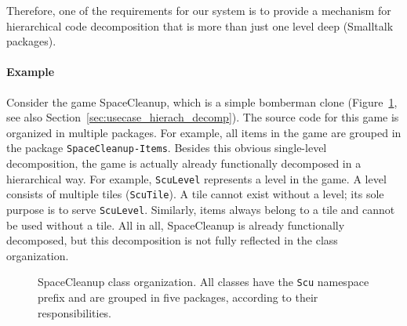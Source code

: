 Therefore, one of the requirements for our system is to provide a mechanism for hierarchical code decomposition that is more than just one level deep (Smalltalk packages).

\paragraph{Example}
Consider the game SpaceCleanup, which is a simple bomberman clone (Figure~\ref{fig:prob_space_cleanup_org}, see also Section~\ref{sec:usecase_hierach_decomp}). The source code for this game is organized in multiple packages. For example, all items in the game are grouped in the package \texttt{SpaceCleanup-Items}. Besides this obvious single-level decomposition, the game is actually already functionally decomposed in a hierarchical way. For example, \texttt{ScuLevel} represents a level in the game. A level consists of multiple tiles (\texttt{ScuTile}). A tile cannot exist without a level; its sole purpose is to serve \texttt{ScuLevel}. Similarly, items always belong to a tile and cannot be used without a tile. All in all, SpaceCleanup is already functionally decomposed, but this decomposition is not fully reflected in the class organization.

\begin{figure}[!htp]
\vspace{10pt}
\vspace{10pt}
\vspace{10pt}
\vspace{10pt}
\caption[SpaceCleanup class organization]{SpaceCleanup class organization. All classes have the \texttt{Scu} namespace prefix and are grouped in five packages, according to their responsibilities.}
\label{fig:prob_space_cleanup_org}
\end{figure}


